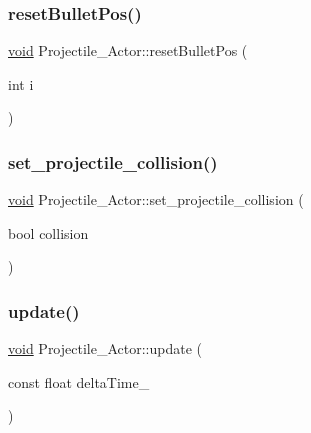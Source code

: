 \subsubsection{\texorpdfstring{reset\+Bullet\+Pos()}{resetBulletPos()}}
{\footnotesize\ttfamily \hyperlink{imgui__impl__opengl3__loader_8h_ac668e7cffd9e2e9cfee428b9b2f34fa7}{void} Projectile\+\_\+\+Actor\+::reset\+Bullet\+Pos (\begin{DoxyParamCaption}\item[{int}]{i }\end{DoxyParamCaption})}

\mbox{\label{classProjectile__Actor_a5bad8780253a216f0ed9bf160cc2c760}} 
\subsubsection{\texorpdfstring{set\+\_\+projectile\+\_\+collision()}{set\_projectile\_collision()}}
{\footnotesize\ttfamily \hyperlink{imgui__impl__opengl3__loader_8h_ac668e7cffd9e2e9cfee428b9b2f34fa7}{void} Projectile\+\_\+\+Actor\+::set\+\_\+projectile\+\_\+collision (\begin{DoxyParamCaption}\item[{bool}]{collision }\end{DoxyParamCaption})\hspace{0.3cm}{\ttfamily [inline]}}

\mbox{\label{classProjectile__Actor_ab61aec7117a93626c3096bef71ab30fc}} 
\subsubsection{\texorpdfstring{update()}{update()}}
{\footnotesize\ttfamily \hyperlink{imgui__impl__opengl3__loader_8h_ac668e7cffd9e2e9cfee428b9b2f34fa7}{void} Projectile\+\_\+\+Actor\+::update (\begin{DoxyParamCaption}\item[{const float}]{delta\+Time\+\_\+ }\end{DoxyParamCaption})\hspace{0.3cm}{\ttfamily [virtual]}}



